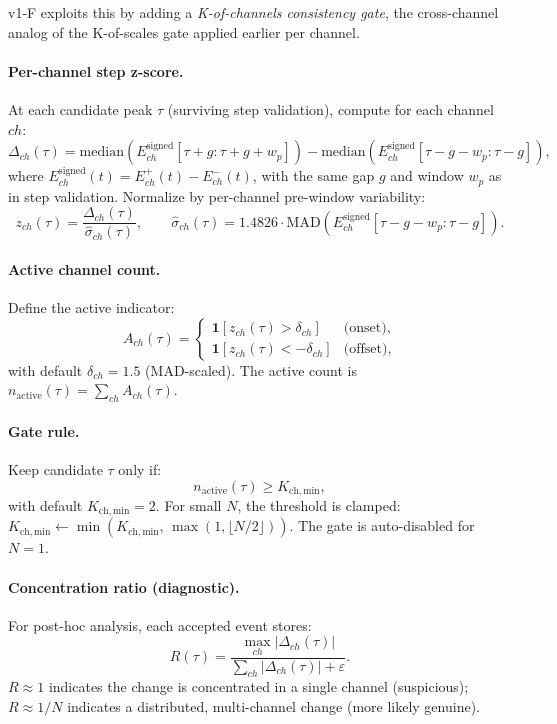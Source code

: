 \documentclass{article}
\begin{document}
v1-F exploits this by adding a \emph{K-of-channels consistency gate}, the cross-channel analog of the
K-of-scales gate applied earlier per channel.

\paragraph{Per-channel step z-score.}
At each candidate peak $\tau$ (surviving step validation), compute for each channel $ch$:
\[
\Delta_{ch}(\tau) = \mathrm{median}\!\left(E^{\mathrm{signed}}_{ch}[\tau+g:\tau+g+w_p]\right)
 - \mathrm{median}\!\left(E^{\mathrm{signed}}_{ch}[\tau-g-w_p:\tau-g]\right),
\]
where $E^{\mathrm{signed}}_{ch}(t) = E^{+}_{ch}(t) - E^{-}_{ch}(t)$, with the same gap $g$ and
window $w_p$ as in step validation. Normalize by per-channel pre-window variability:
\[
z_{ch}(\tau) = \frac{\Delta_{ch}(\tau)}{\hat{\sigma}_{ch}(\tau)},
\qquad
\hat{\sigma}_{ch}(\tau) = 1.4826\cdot\mathrm{MAD}\!\left(E^{\mathrm{signed}}_{ch}[\tau-g-w_p:\tau-g]\right).
\]

\paragraph{Active channel count.}
Define the active indicator:
\[
A_{ch}(\tau) =
\begin{cases}
\mathbf{1}[z_{ch}(\tau) > \delta_{ch}] & \text{(onset)}, \\
\mathbf{1}[z_{ch}(\tau) < -\delta_{ch}] & \text{(offset)},
\end{cases}
\]
with default $\delta_{ch} = 1.5$ (MAD-scaled). The active count is $n_{\mathrm{active}}(\tau) = \sum_{ch} A_{ch}(\tau)$.

\paragraph{Gate rule.}
Keep candidate $\tau$ only if:
\[
n_{\mathrm{active}}(\tau) \ge K_{\mathrm{ch,min}},
\]
with default $K_{\mathrm{ch,min}} = 2$. For small $N$, the threshold is clamped:
$K_{\mathrm{ch,min}} \leftarrow \min(K_{\mathrm{ch,min}},\, \max(1, \lfloor N/2\rfloor))$.
The gate is auto-disabled for $N = 1$.

\paragraph{Concentration ratio (diagnostic).}
For post-hoc analysis, each accepted event stores:
\[
R(\tau) = \frac{\max_{ch}|\Delta_{ch}(\tau)|}{\sum_{ch}|\Delta_{ch}(\tau)| + \varepsilon}.
\]
$R \approx 1$ indicates the change is concentrated in a single channel (suspicious);
$R \approx 1/N$ indicates a distributed, multi-channel change (more likely genuine).
\end{document}
